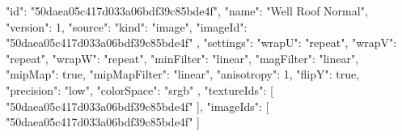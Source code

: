 {
  "id": "50daea05c417d033a06bdf39c85bde4f",
  "name": "Well Roof Normal",
  "version": 1,
  "source": {
    "kind": "image",
    "imageId": "50daea05c417d033a06bdf39c85bde4f"
  },
  "settings": {
    "wrapU": "repeat",
    "wrapV": "repeat",
    "wrapW": "repeat",
    "minFilter": "linear",
    "magFilter": "linear",
    "mipMap": true,
    "mipMapFilter": "linear",
    "anisotropy": 1,
    "flipY": true,
    "precision": "low",
    "colorSpace": "srgb"
  },
  "textureIds": [
    "50daea05c417d033a06bdf39c85bde4f"
  ],
  "imageIds": [
    "50daea05c417d033a06bdf39c85bde4f"
  ]
}
